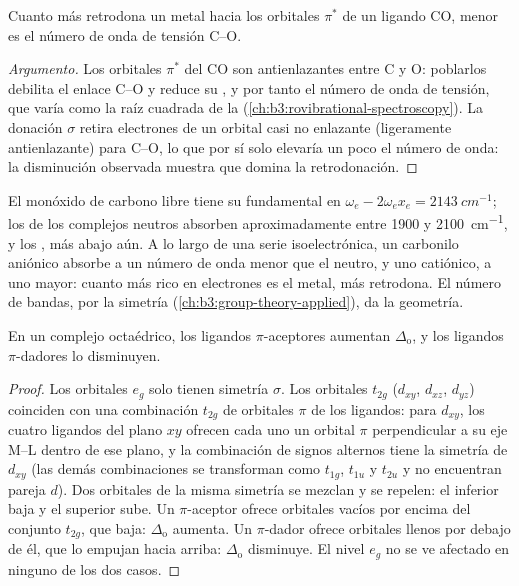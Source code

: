 \begin{proposition}\label{prop:b3:organometallic-bonding:co-frequency}
Cuanto más retrodona un metal hacia los orbitales $\pi^*$ de un ligando CO, menor es el
número de onda de tensión C--O.
\end{proposition}

\begin{proof}[Argumento]
Los orbitales $\pi^*$ del CO son antienlazantes entre C y O: poblarlos debilita el
enlace C--O y reduce su , y por tanto el número de onda de tensión, que
varía como la raíz cuadrada de la  (\cref{ch:b3:rovibrational-spectroscopy}).
La donación $\sigma$ retira electrones de un orbital casi no enlazante (ligeramente
antienlazante) para C--O, lo que por sí solo elevaría un poco el número de onda: la
disminución observada muestra que domina la retrodonación.
\end{proof}

El monóxido de carbono libre tiene su fundamental en $\omega_e - 2\omega_ex_e = \qty{2143}{cm^{-1}}$; los  de los complejos neutros absorben aproximadamente entre 1900 y \qty{2100}{cm^{-1}},
y los , más abajo aún. A lo largo de una serie isoelectrónica, un carbonilo
aniónico absorbe a un número de onda menor que el neutro, y uno catiónico, a uno
mayor: cuanto más rico en electrones es el metal, más retrodona. El número de
bandas, por la simetría (\cref{ch:b3:group-theory-applied}), da la geometría.

\begin{proposition}\label{prop:b3:organometallic-bonding:pi-delta}
En un complejo octaédrico, los ligandos $\pi$-aceptores aumentan $\Delta_{\mathrm o}$, y los ligandos $\pi$-dadores
lo disminuyen.
\end{proposition}

\begin{proof}
Los orbitales $e_g$ solo tienen simetría $\sigma$. Los orbitales $t_{2g}$ ($d_{xy}$, $d_{xz}$, $d_{yz}$) coinciden con una combinación $t_{2g}$
de orbitales $\pi$ de los ligandos: para $d_{xy}$, los cuatro ligandos del plano $xy$
ofrecen cada uno un orbital $\pi$ perpendicular a su eje M--L dentro de ese plano, y la
combinación de signos alternos tiene la simetría de $d_{xy}$ (las demás
combinaciones se transforman como $t_{1g}$, $t_{1u}$ y $t_{2u}$ y no encuentran pareja $d$). Dos orbitales de
la misma simetría se mezclan y se repelen: el inferior baja y el superior sube. Un
$\pi$-aceptor ofrece orbitales vacíos por encima del conjunto $t_{2g}$, que baja: $\Delta_{\mathrm o}$
aumenta. Un $\pi$-dador ofrece orbitales llenos por debajo de él, que lo empujan hacia arriba: $\Delta_{\mathrm o}$
disminuye. El nivel $e_g$ no se ve afectado en ninguno de los dos casos.
\end{proof}

